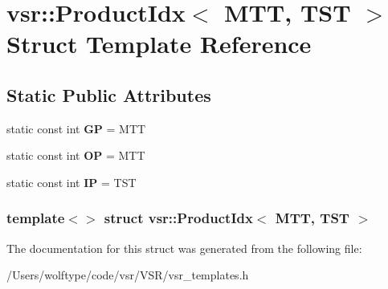 \hypertarget{structvsr_1_1_product_idx_3_01_m_t_t_00_01_t_s_t_01_4}{\section{vsr\-:\-:Product\-Idx$<$ M\-T\-T, T\-S\-T $>$ Struct Template Reference}
\label{structvsr_1_1_product_idx_3_01_m_t_t_00_01_t_s_t_01_4}
}
\subsection*{Static Public Attributes}
\begin{DoxyCompactItemize}
\item 
\hypertarget{structvsr_1_1_product_idx_3_01_m_t_t_00_01_t_s_t_01_4_a4e6ccd1d87463a50122294e081bde40b}{static const int {\bfseries G\-P} = M\-T\-T}\label{structvsr_1_1_product_idx_3_01_m_t_t_00_01_t_s_t_01_4_a4e6ccd1d87463a50122294e081bde40b}

\item 
\hypertarget{structvsr_1_1_product_idx_3_01_m_t_t_00_01_t_s_t_01_4_afc730ac0fe2291a168f99871ca1c9b8e}{static const int {\bfseries O\-P} = M\-T\-T}\label{structvsr_1_1_product_idx_3_01_m_t_t_00_01_t_s_t_01_4_afc730ac0fe2291a168f99871ca1c9b8e}

\item 
\hypertarget{structvsr_1_1_product_idx_3_01_m_t_t_00_01_t_s_t_01_4_a8a9474dff0473eecc863bef4ddd768ba}{static const int {\bfseries I\-P} = T\-S\-T}\label{structvsr_1_1_product_idx_3_01_m_t_t_00_01_t_s_t_01_4_a8a9474dff0473eecc863bef4ddd768ba}

\end{DoxyCompactItemize}
\subsubsection*{template$<$$>$ struct vsr\-::\-Product\-Idx$<$ M\-T\-T, T\-S\-T $>$}



The documentation for this struct was generated from the following file\-:\begin{DoxyCompactItemize}
\item 
/\-Users/wolftype/code/vsr/\-V\-S\-R/vsr\-\_\-templates.\-h\end{DoxyCompactItemize}
